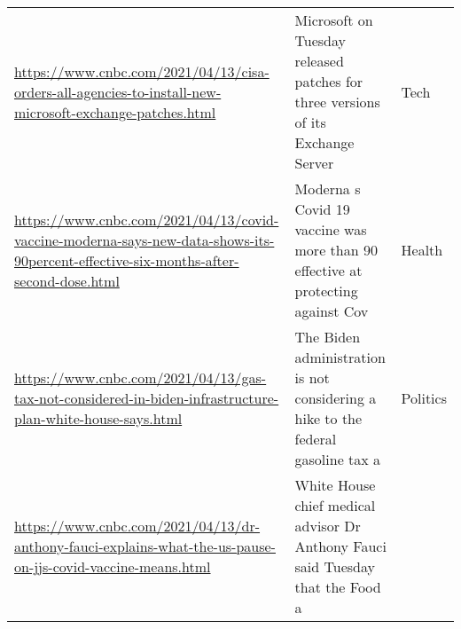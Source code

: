 \documentclass[
]{article}
\begin{document}
\begin{longtable}[]{@{}lll@{}}
\begin{minipage}[t]{0.54\columnwidth}\raggedright
\url{https://www.cnbc.com/2021/04/13/cisa-orders-all-agencies-to-install-new-microsoft-exchange-patches.html}\strut
\end{minipage} & \begin{minipage}[t]{0.33\columnwidth}\raggedright
Microsoft on Tuesday released patches for three versions of its Exchange
Server\strut
\end{minipage} & \begin{minipage}[t]{0.04\columnwidth}\raggedright
Tech\strut
\end{minipage}\tabularnewline
\begin{minipage}[t]{0.54\columnwidth}\raggedright
\url{https://www.cnbc.com/2021/04/13/covid-vaccine-moderna-says-new-data-shows-its-90percent-effective-six-months-after-second-dose.html}\strut
\end{minipage} & \begin{minipage}[t]{0.33\columnwidth}\raggedright
Moderna s Covid 19 vaccine was more than 90 effective at protecting
against Cov\strut
\end{minipage} & \begin{minipage}[t]{0.04\columnwidth}\raggedright
Health\strut
\end{minipage}\tabularnewline
\begin{minipage}[t]{0.54\columnwidth}\raggedright
\url{https://www.cnbc.com/2021/04/13/gas-tax-not-considered-in-biden-infrastructure-plan-white-house-says.html}\strut
\end{minipage} & \begin{minipage}[t]{0.33\columnwidth}\raggedright
The Biden administration is not considering a hike to the federal
gasoline tax a\strut
\end{minipage} & \begin{minipage}[t]{0.04\columnwidth}\raggedright
Politics\strut
\end{minipage}\tabularnewline
\begin{minipage}[t]{0.54\columnwidth}\raggedright
\url{https://www.cnbc.com/2021/04/13/dr-anthony-fauci-explains-what-the-us-pause-on-jjs-covid-vaccine-means.html}\strut
\end{minipage} & \begin{minipage}[t]{0.33\columnwidth}\raggedright
White House chief medical advisor Dr Anthony Fauci said Tuesday that the
Food a\strut
\end{minipage} & \begin{minipage}[t]{0.04\columnwidth}\raggedright

\end{minipage}
\end{longtable}
\end{document}
